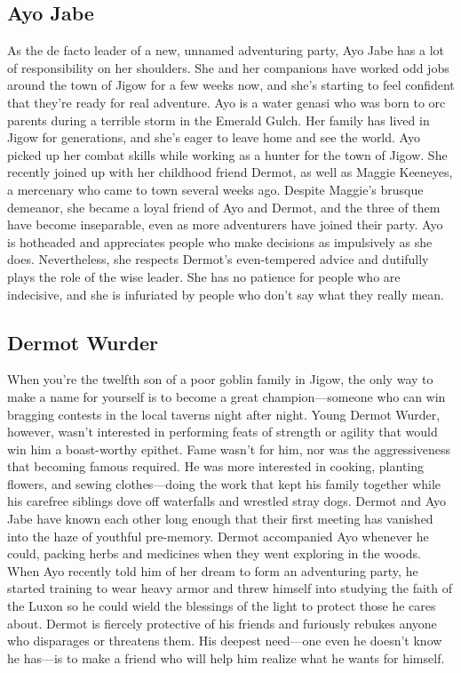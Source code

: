 \documentclass[10pt,a4,twoside,twocolumn,openany,nodeprecatedcode]{dndbook}
\begin{document}
\subsection{Ayo Jabe}
As the de facto leader of a new, unnamed adventuring party, Ayo Jabe has a lot of responsibility on her shoulders. She and her companions have worked odd jobs around the town of Jigow for a few weeks now, and she's starting to feel confident that they're ready for real adventure.
Ayo is a water genasi who was born to orc parents during a terrible storm in the Emerald Gulch. Her family has lived in Jigow for generations, and she's eager to leave home and see the world.
Ayo picked up her combat skills while working as a hunter for the town of Jigow. She recently joined up with her childhood friend Dermot, as well as Maggie Keeneyes, a mercenary who came to town several weeks ago. Despite Maggie's brusque demeanor, she became a loyal friend of Ayo and Dermot, and the three of them have become inseparable, even as more adventurers have joined their party.
Ayo is hotheaded and appreciates people who make decisions as impulsively as she does. Nevertheless, she respects Dermot's even-tempered advice and dutifully plays the role of the wise leader. She has no patience for people who are indecisive, and she is infuriated by people who don't say what they really mean.
\subsection{Dermot Wurder}
When you're the twelfth son of a poor goblin family in Jigow, the only way to make a name for yourself is to become a great champion—someone who can win bragging contests in the local taverns night after night. Young Dermot Wurder, however, wasn't interested in performing feats of strength or agility that would win him a boast-worthy epithet. Fame wasn't for him, nor was the aggressiveness that becoming famous required. He was more interested in cooking, planting flowers, and sewing clothes—doing the work that kept his family together while his carefree siblings dove off waterfalls and wrestled stray dogs.
Dermot and Ayo Jabe have known each other long enough that their first meeting has vanished into the haze of youthful pre-memory. Dermot accompanied Ayo whenever he could, packing herbs and medicines when they went exploring in the woods. When Ayo recently told him of her dream to form an adventuring party, he started training to wear heavy armor and threw himself into studying the faith of the Luxon so he could wield the blessings of the light to protect those he cares about.
Dermot is fiercely protective of his friends and furiously rebukes anyone who disparages or threatens them. His deepest need—one even he doesn't know he has—is to make a friend who will help him realize what he wants for himself.
\end{document}
